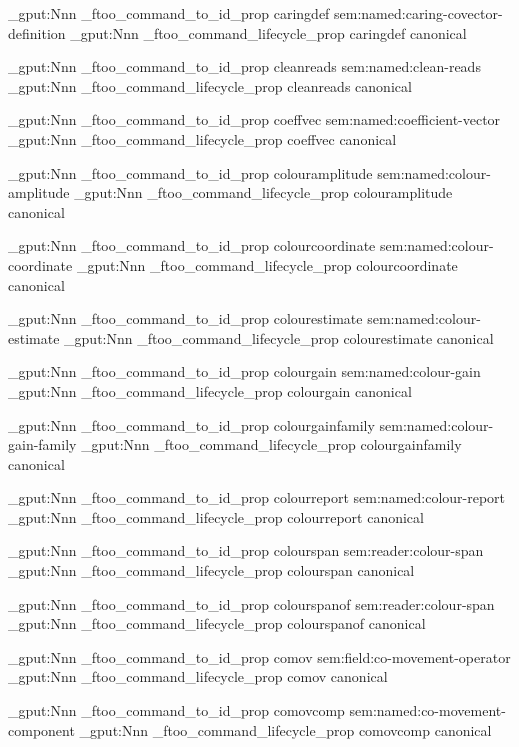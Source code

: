 \prop_gput:Nnn \g_ftoo_command_to_id_prop { caringdef } { sem:named:caring-covector-definition }
\prop_gput:Nnn \g_ftoo_command_lifecycle_prop { caringdef } { canonical }


\prop_gput:Nnn \g_ftoo_command_to_id_prop { cleanreads } { sem:named:clean-reads }
\prop_gput:Nnn \g_ftoo_command_lifecycle_prop { cleanreads } { canonical }


\prop_gput:Nnn \g_ftoo_command_to_id_prop { coeffvec } { sem:named:coefficient-vector }
\prop_gput:Nnn \g_ftoo_command_lifecycle_prop { coeffvec } { canonical }


\prop_gput:Nnn \g_ftoo_command_to_id_prop { colouramplitude } { sem:named:colour-amplitude }
\prop_gput:Nnn \g_ftoo_command_lifecycle_prop { colouramplitude } { canonical }


\prop_gput:Nnn \g_ftoo_command_to_id_prop { colourcoordinate } { sem:named:colour-coordinate }
\prop_gput:Nnn \g_ftoo_command_lifecycle_prop { colourcoordinate } { canonical }


\prop_gput:Nnn \g_ftoo_command_to_id_prop { colourestimate } { sem:named:colour-estimate }
\prop_gput:Nnn \g_ftoo_command_lifecycle_prop { colourestimate } { canonical }


\prop_gput:Nnn \g_ftoo_command_to_id_prop { colourgain } { sem:named:colour-gain }
\prop_gput:Nnn \g_ftoo_command_lifecycle_prop { colourgain } { canonical }


\prop_gput:Nnn \g_ftoo_command_to_id_prop { colourgainfamily } { sem:named:colour-gain-family }
\prop_gput:Nnn \g_ftoo_command_lifecycle_prop { colourgainfamily } { canonical }


\prop_gput:Nnn \g_ftoo_command_to_id_prop { colourreport } { sem:named:colour-report }
\prop_gput:Nnn \g_ftoo_command_lifecycle_prop { colourreport } { canonical }


\prop_gput:Nnn \g_ftoo_command_to_id_prop { colourspan } { sem:reader:colour-span }
\prop_gput:Nnn \g_ftoo_command_lifecycle_prop { colourspan } { canonical }


\prop_gput:Nnn \g_ftoo_command_to_id_prop { colourspanof } { sem:reader:colour-span }
\prop_gput:Nnn \g_ftoo_command_lifecycle_prop { colourspanof } { canonical }


\prop_gput:Nnn \g_ftoo_command_to_id_prop { comov } { sem:field:co-movement-operator }
\prop_gput:Nnn \g_ftoo_command_lifecycle_prop { comov } { canonical }


\prop_gput:Nnn \g_ftoo_command_to_id_prop { comovcomp } { sem:named:co-movement-component }
\prop_gput:Nnn \g_ftoo_command_lifecycle_prop { comovcomp } { canonical }


